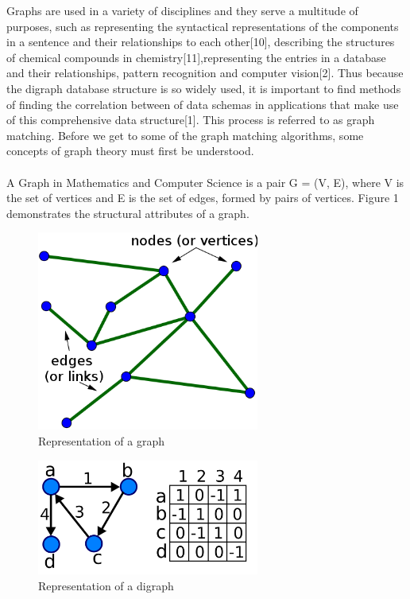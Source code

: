 \label{Introduction}
Graphs are used in a variety of disciplines and they serve a multitude of purposes, such as representing the syntactical representations of the components in a sentence and their relationships to each other[10], describing the structures of chemical compounds in chemistry[11],representing the entries in a database and their relationships, pattern recognition and computer vision[2]. Thus because the digraph database structure is so widely used, it is important to find methods of finding the correlation between of data schemas in applications that make use of this comprehensive data structure[1]. This process is referred to as graph matching. Before we get to some of the graph matching algorithms, some concepts of graph theory must first be understood.\\\\
A Graph in Mathematics and Computer Science is a pair G = (V, E),  where V is the set of vertices and E is the set of edges, formed by pairs of vertices. Figure 1 demonstrates the structural attributes of a graph.

\begin{figure}[H]
  \begin{center}
      \includegraphics[width=0.65\textwidth]{graph.PNG}
  \end{center}    
  \caption{Representation of a graph}
\end{figure}

\begin{figure}[H]
  \begin{center}
      \includegraphics[width=0.65\textwidth]{digraph.PNG}
  \end{center}    
  \caption{Representation of a digraph}
\end{figure}

